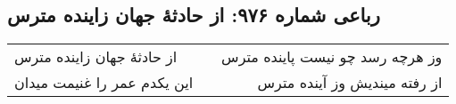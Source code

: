 \begin{center}
\section*{رباعی شماره ۹۷۶: از حادثهٔ جهان زاینده مترس}
\label{sec:0976}
\begin{longtable}{l p{0.5cm} r}
از حادثهٔ جهان زاینده مترس
&&
وز هرچه رسد چو نیست پاینده مترس
\\
این یکدم عمر را غنیمت میدان
&&
از رفته میندیش وز آینده مترس
\\
\end{longtable}
\end{center}

